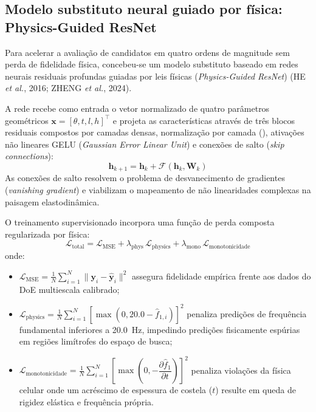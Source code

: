 \subsection{Modelo substituto neural guiado por física: Physics-Guided ResNet}
\label{subsec:pgresnet-stack}

Para acelerar a avaliação de candidatos em quatro ordens de magnitude sem perda de fidelidade física, concebeu-se um modelo substituto baseado em redes neurais residuais profundas guiadas por leis físicas (\textit{Physics-Guided ResNet}) (HE \textit{et al.}, 2016; ZHENG \textit{et al.}, 2024).

A rede recebe como entrada o vetor normalizado de quatro parâmetros geométricos $\mathbf{x} = [\theta, t, l, h]^\top$ e projeta as características através de três blocos residuais compostos por camadas densas, normalização por camada (), ativações não lineares GELU (\textit{Gaussian Error Linear Unit}) e conexões de salto (\textit{skip connections}):
\begin{equation}
  \mathbf{h}_{k+1} = \mathbf{h}_k + \mathcal{F}(\mathbf{h}_k, \mathbf{W}_k)
  \label{eq:resnet-bloco}
\end{equation}
As conexões de salto resolvem o problema de desvanecimento de gradientes (\textit{vanishing gradient}) e viabilizam o mapeamento de não linearidades complexas na paisagem elastodinâmica.

O treinamento supervisionado incorpora uma função de perda composta regularizada por física:
\begin{equation}
  \mathcal{L}_{\text{total}} = \mathcal{L}_{\text{MSE}} + \lambda_{\text{phys}}\,\mathcal{L}_{\text{physics}} + \lambda_{\text{mono}}\,\mathcal{L}_{\text{monotonicidade}}
  \label{eq:loss-composta-stack}
\end{equation}
onde:
\begin{itemize}
  \item $\mathcal{L}_{\text{MSE}} = \frac{1}{N} \sum_{i=1}^N \|\mathbf{y}_i - \hat{\mathbf{y}}_i\|^2$ assegura fidelidade empírica frente aos dados do DoE multiescala calibrado;
  \item $\mathcal{L}_{\text{physics}} = \frac{1}{N} \sum_{i=1}^N \left[ \max(0, 20.0 - \hat{f}_{1,i}) \right]^2$ penaliza predições de frequência fundamental inferiores a \SI{20.0}{\hertz}, impedindo predições fisicamente espúrias em regiões limítrofes do espaço de busca;
  \item $\mathcal{L}_{\text{monotonicidade}} = \frac{1}{N} \sum_{i=1}^N \left[ \max\left(0, -\dfrac{\partial \hat{f}_1}{\partial t}\right) \right]^2$ penaliza violações da física celular onde um acréscimo de espessura de costela ($t$) resulte em queda de rigidez elástica e frequência própria.
\end{itemize}

